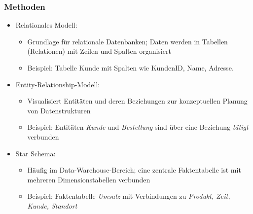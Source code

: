 \documentclass[11pt]{scrartcl}
\begin{document}
\subsubsection{Methoden}
\begin{itemize}
	\item Relationales Modell:
	\begin{itemize}
		\item Grundlage für relationale Datenbanken; Daten werden in Tabellen (Relationen) mit Zeilen und Spalten organisiert
		\item Beispiel: Tabelle Kunde mit Spalten wie KundenID, Name, Adresse.
	\end{itemize}
	\item Entity-Relationship-Modell:
	\begin{itemize}
		\item Visualisiert Entitäten und deren Beziehungen zur konzeptuellen Planung von Datenstrukturen
		\item Beispiel: Entitäten \textit{Kunde} und \textit{Bestellung} sind über eine Beziehung \textit{tätigt} verbunden
	\end{itemize}
	\item Star Schema:
	\begin{itemize}
		\item Häufig im Data-Warehouse-Bereich; eine zentrale Faktentabelle ist mit mehreren Dimensionstabellen verbunden
		\item Beispiel: Faktentabelle \textit{Umsatz} mit Verbindungen zu \textit{Produkt, Zeit, Kunde, Standort}
	\end{itemize}
\end{itemize}
\end{document}
